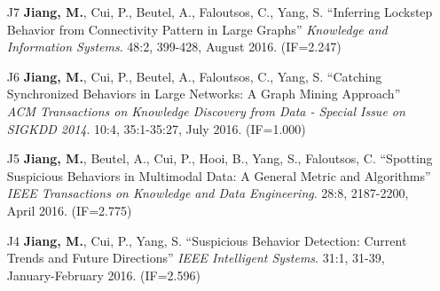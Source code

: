 \documentclass[10pt]{article}
\newenvironment{myindentpar}[1]%
{\begin{list}{}%
         {\setlength{\leftmargin}{#1}}%
         \item[]%
}
{\end{list}}
\newcounter{list}
\newcommand{\hide}[1]{}
\begin{document}
\begin{myindentpar}{0.00cm}
\begin{enumerate}[leftmargin=.5cm]
	\hide{\vspace{-0.1cm}\hspace{0.5cm}{\small \emph{Ms. Gui conceived the idea in consultation with myself. Ms. Gui, Dr. Liu, and I implemented the system and completed the experiments. Ms. Gui wrote the paper.}}}

\item[J7] \textbf{Jiang, M.}, Cui, P., Beutel, A., Faloutsos, C., Yang, S. ``Inferring Lockstep Behavior from Connectivity Pattern in Large Graphs'' \textit{Knowledge and Information Systems}. 48:2, 399-428, August 2016. (IF=2.247)

	\hide{\vspace{-0.1cm}\hspace{0.5cm}{\small \emph{I conceived the idea in consultation with Dr. Faloutsos. I designed the study, completed the experiments, and wrote the paper.}}}

\item[J6] \textbf{Jiang, M.}, Cui, P., Beutel, A., Faloutsos, C., Yang, S. ``Catching Synchronized Behaviors in Large Networks: A Graph Mining Approach'' \textit{ACM Transactions on Knowledge Discovery from Data - Special Issue on SIGKDD 2014}. 10:4, 35:1-35:27, July 2016. (IF=1.000)

	\hide{\vspace{-0.1cm}\hspace{0.5cm}{\small \emph{I conceived the idea in consultation with Dr. Faloutsos. I designed the study, completed the experiments, and wrote the paper.}}}

\item[J5] \textbf{Jiang, M.}, Beutel, A., Cui, P., Hooi, B., Yang, S., Faloutsos, C. ``Spotting Suspicious Behaviors in Multimodal Data: A General Metric and Algorithms'' \textit{IEEE Transactions on Knowledge and Data Engineering}. 28:8, 2187-2200, April 2016. (IF=2.775)

	\hide{\vspace{-0.1cm}\hspace{0.5cm}{\small \emph{I conceived the idea in consultation with Dr. Faloutsos. I designed the study, completed the experiments, and wrote the paper.}}}

\item[J4] \textbf{Jiang, M.}, Cui, P., Yang, S. ``Suspicious Behavior Detection: Current Trends and Future Directions'' \textit{IEEE Intelligent Systems}. 31:1, 31-39, January-February 2016. (IF=2.596)

	\hide{\vspace{-0.1cm}\hspace{0.5cm}{\small \emph{I conceived the idea in consultation with Dr. Cui. I designed the survey and wrote the paper. Dr. Cui edited the paper.}}}


\end{enumerate}
\end{myindentpar}
\end{document}
